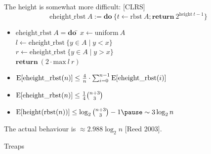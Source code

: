 \documentclass[%
	sans,
	12pt,
]{beamer}
\newcommand{\high}[1]{{\usebeamercolor[fg]{structure} #1}}
\newcommand{\expectation}{\text{\upshape E}}
\begin{document}
\begin{frame}
The height is somewhat more difficult: [CLRS]\pause
\[\text{eheight\_rbst}\ A := \textbf{do}\ \{t \leftarrow \text{rbst}\ A; \textbf{return}\ 2^{\text{height}\ t - 1}\}\]\pause
\vspace*{-1.5em}
\begin{theorem}\upshape
\vspace*{-0.4em}
\begin{itemize}
\item 
\begin{tabbing}
$\text{eheight\_rbst}\ A = \textbf{do}\ $\= $x \leftarrow \text{uniform}\ A$\\
\> $l \leftarrow \text{eheight\_rbst}\ \{y\in A\mid y < x\}$\\
\> $r \leftarrow \text{eheight\_rbst}\ \{y\in A\mid y > x\}$\\
\> $\textbf{return}\ (2 \cdot \text{max}\ l\ r)$
\end{tabbing}
\pause
\item
$\expectation[\text{eheight\_rbst}(n)] \leq \frac{4}{n}\cdot \sum_{i=0}^{n-1} \expectation[\text{eheight\_rbst}(i)]$\pause\\[3mm]
\item
$\expectation[\text{eheight\_rbst}(n)] \leq \frac{1}{4} {{n + 3} \choose 3}$\\[2mm]\pause%
\item
$\expectation[\text{height}(\text{rbst}(n))] \leq \log_2 {{n + 3} \choose 3} - 1\pause \sim 3 \log_2 n$\pause
\end{itemize}
\end{theorem}
The actual behaviour is $\approx 2.988 \log_2 n$ [Reed 2003].
\end{frame}


\begin{frame}
\begin{center}
\huge\high{Treaps}
\end{center}
\end{frame}
\end{document}
